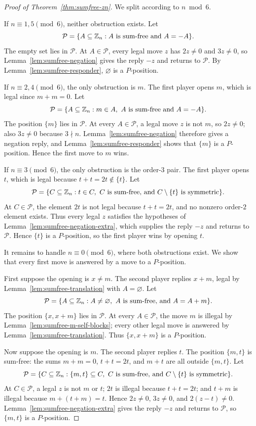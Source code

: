 \begin{proof}[Proof of Theorem~\ref{thm:sumfree-zn}]
We split according to $n\bmod 6$.

If $n\equiv 1,5\pmod 6$, neither obstruction exists. Let
\[
  \mathcal P=\{A\subseteq \mathbb{Z}_{n}: A\text{ is sum-free and }A=-A\}.
\]
The empty set lies in $\mathcal P$. At $A\in\mathcal P$, every legal move $z$ has
$2z\neq 0$ and $3z\neq 0$, so Lemma~\ref{lem:sumfree-negation} gives the reply $-z$
and returns to $\mathcal P$. By Lemma~\ref{lem:sumfree-responder}, $\varnothing$ is a
$P$-position.

If $n\equiv 2,4\pmod 6$, the only obstruction is $m$. The first player opens $m$, which
is legal since $m+m=0$. Let
\[
  \mathcal P=\{A\subseteq \mathbb{Z}_{n}: m\in A,\ A\text{ is sum-free and }A=-A\}.
\]
The position $\{m\}$ lies in $\mathcal P$. At every $A\in\mathcal P$, a legal move
$z$ is not $m$, so $2z\neq 0$; also $3z\neq 0$ because $3\nmid n$. Lemma~\ref{lem:sumfree-negation}
therefore gives a negation reply, and Lemma~\ref{lem:sumfree-responder} shows that
$\{m\}$ is a $P$-position. Hence the first move to $m$ wins.

If $n\equiv 3\pmod 6$, the only obstruction is the order-$3$ pair. The first player
opens $t$, which is legal because $t+t=2t\notin\{t\}$. Let
\[
  \mathcal P=\{C\subseteq \mathbb{Z}_{n}: t\in C,\ C\text{ is sum-free, and }C\setminus\{t\}
    \text{ is symmetric}\}.
\]
At $C\in\mathcal P$, the element $2t$ is not legal because $t+t=2t$, and no nonzero
order-$2$ element exists. Thus every legal $z$ satisfies the hypotheses of
Lemma~\ref{lem:sumfree-negation-extra}, which supplies the reply $-z$ and returns to
$\mathcal P$. Hence $\{t\}$ is a $P$-position, so the first player wins by opening $t$.

It remains to handle $n\equiv 0\pmod 6$, where both obstructions exist. We show that
every first move is answered by a move to a $P$-position.

First suppose the opening is $x\neq m$. The second player replies $x+m$, legal by
Lemma~\ref{lem:sumfree-translation} with $A=\varnothing$. Let
\[
  \mathcal P=\{A\subseteq \mathbb{Z}_{n}: A\neq\varnothing,\ A\text{ is sum-free, and }A=A+m\}.
\]
The position $\{x,x+m\}$ lies in $\mathcal P$. At every $A\in\mathcal P$, the move $m$
is illegal by Lemma~\ref{lem:sumfree-m-self-blocks}; every other legal move is answered
by Lemma~\ref{lem:sumfree-translation}. Thus $\{x,x+m\}$ is a $P$-position.

Now suppose the opening is $m$. The second player replies $t$. The position $\{m,t\}$
is sum-free: the sums $m+m=0$, $t+t=2t$, and $m+t$ are all outside $\{m,t\}$. Let
\[
  \mathcal P=\{C\subseteq \mathbb{Z}_{n}: \{m,t\}\subseteq C,\ C\text{ is sum-free, and }
    C\setminus\{t\}\text{ is symmetric}\}.
\]
At $C\in\mathcal P$, a legal $z$ is not $m$ or $t$; $2t$ is illegal because $t+t=2t$;
and $t+m$ is illegal because $m+(t+m)=t$. Hence $2z\neq 0$, $3z\neq 0$, and
$2(z-t)\neq 0$. Lemma~\ref{lem:sumfree-negation-extra} gives the reply $-z$ and returns
to $\mathcal P$, so $\{m,t\}$ is a $P$-position.


\end{proof}
